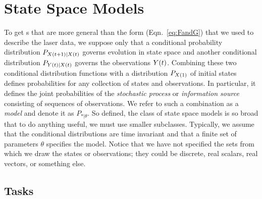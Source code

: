 \section{State Space Models}
\label{sec:formal_ssm}

To get s that are more general than the form
(Eqn.~\eqref{eq:FandG}) that we used to describe the laser data, we
suppose only that a conditional probability distribution
$P_{{X}{(t+1)}|{X}{(t)}}$ governs evolution in state space and
another conditional distribution $P_{{Y}{(t)}|{X}{(t)}}$ governs the
observations ${Y}{(t)}$.  Combining these two conditional
distribution functions with a distribution $P_{{X}{(1)}}$ of initial
states defines probabilities for any collection of states and
observations.  In particular, it defines the joint probabilities of
the \emph{stochastic process} or \emph{information source} consisting
of sequences of observations.  We refer to such a combination as a
\emph{model} and denote it as $P_{*|\theta}$.  So defined, the class
of state space models is so broad that to do anything useful, we must
use smaller subclasses.  Typically, we assume that the conditional
distributions are time invariant and that a finite set of parameters
$\theta$ specifies the model.  Notice that we have not specified the
sets from which we draw the states or observations; they could be
discrete, real scalars, real vectors, or something else.


\subsection{Tasks}
\label{sec:tasks}

